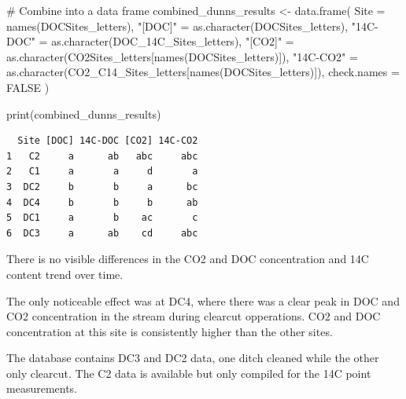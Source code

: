 \documentclass[
  letterpaper,
  DIV=11,
  numbers=noendperiod]{scrartcl}
\newenvironment{Shaded}{\begin{snugshade}}{\end{snugshade}}
\newcommand{\AttributeTok}[1]{\textcolor[rgb]{0.40,0.45,0.13}{#1}}
\newcommand{\CommentTok}[1]{\textcolor[rgb]{0.37,0.37,0.37}{#1}}
\newcommand{\ConstantTok}[1]{\textcolor[rgb]{0.56,0.35,0.01}{#1}}
\newcommand{\FunctionTok}[1]{\textcolor[rgb]{0.28,0.35,0.67}{#1}}
\newcommand{\NormalTok}[1]{\textcolor[rgb]{0.00,0.23,0.31}{#1}}
\newcommand{\OtherTok}[1]{\textcolor[rgb]{0.00,0.23,0.31}{#1}}
\newcommand{\StringTok}[1]{\textcolor[rgb]{0.13,0.47,0.30}{#1}}
\begin{document}
\begin{Shaded}
\begin{Highlighting}[]
        
\CommentTok{\# Combine into a data frame}
\NormalTok{combined\_dunns\_results }\OtherTok{\textless{}{-}} \FunctionTok{data.frame}\NormalTok{(}
  \AttributeTok{Site =} \FunctionTok{names}\NormalTok{(DOCSites\_letters),}
  \StringTok{"[DOC]"} \OtherTok{=} \FunctionTok{as.character}\NormalTok{(DOCSites\_letters),}
  \StringTok{"14C{-}DOC"} \OtherTok{=} \FunctionTok{as.character}\NormalTok{(DOC\_14C\_Sites\_letters),}
  \StringTok{"[CO2]"} \OtherTok{=} \FunctionTok{as.character}\NormalTok{(CO2Sites\_letters[}\FunctionTok{names}\NormalTok{(DOCSites\_letters)]),}
  \StringTok{"14C{-}CO2"} \OtherTok{=} \FunctionTok{as.character}\NormalTok{(CO2\_C14\_Sites\_letters[}\FunctionTok{names}\NormalTok{(DOCSites\_letters)]),}
  \AttributeTok{check.names =} \ConstantTok{FALSE}
\NormalTok{)}

\FunctionTok{print}\NormalTok{(combined\_dunns\_results)}
\end{Highlighting}
\end{Shaded}

\begin{verbatim}
  Site [DOC] 14C-DOC [CO2] 14C-CO2
1   C2     a      ab   abc     abc
2   C1     a       a     d       a
3  DC2     b       b     a      bc
4  DC4     b       b     b      ab
5  DC1     a       b    ac       c
6  DC3     a      ab    cd     abc
\end{verbatim}

\begin{tcolorbox}[enhanced jigsaw, opacitybacktitle=0.6, opacityback=0, arc=.35mm, left=2mm, toprule=.15mm, colback=white, coltitle=black, breakable, rightrule=.15mm, colbacktitle=quarto-callout-note-color!10!white, title=\textcolor{quarto-callout-note-color}{\faInfo}\hspace{0.5em}{Interpretation}, colframe=quarto-callout-note-color-frame, toptitle=1mm, bottomrule=.15mm, bottomtitle=1mm, titlerule=0mm, leftrule=.75mm]

There is no visible differences in the CO2 and DOC concentration and 14C
content trend over time.

The only noticeable effect was at DC4, where there was a clear peak in
DOC and CO2 concentration in the stream during clearcut opperations. CO2
and DOC concentration at this site is consistently higher than the other
sites.

\end{tcolorbox}

\begin{tcolorbox}[enhanced jigsaw, opacitybacktitle=0.6, opacityback=0, arc=.35mm, left=2mm, toprule=.15mm, colback=white, coltitle=black, breakable, rightrule=.15mm, colbacktitle=quarto-callout-important-color!10!white, title=\textcolor{quarto-callout-important-color}{\faExclamation}\hspace{0.5em}{Q data}, colframe=quarto-callout-important-color-frame, toptitle=1mm, bottomrule=.15mm, bottomtitle=1mm, titlerule=0mm, leftrule=.75mm]

The database contains DC3 and DC2 data, one ditch cleaned while the
other only clearcut. The C2 data is available but only compiled for the
14C point measurements.

\end{tcolorbox}
\end{document}
